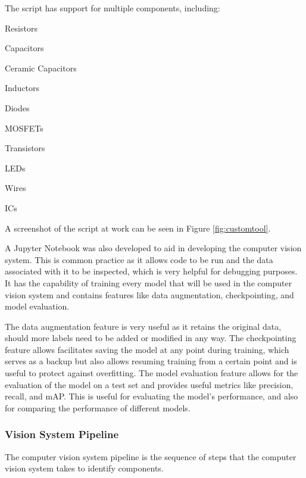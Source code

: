 The script has support for multiple components, including:
\begin{multicols}{2}
    \begin{mylist}
        \item Resistors
        \item Capacitors
        \item Ceramic Capacitors
        \item Inductors
        \item Diodes
        \item MOSFETs
        \item Transistors
        \item LEDs
        \item Wires
        \item ICs
    \end{mylist}
\end{multicols}

\noindent
A screenshot of the script at work can be seen in Figure \ref*{fig:customtool}.

A Jupyter Notebook\cite{jupyter} was also developed to aid in developing the computer vision system. This is common practice as it
allows code to be run and the data associated with it to be inspected, which is very helpful for debugging purposes. It 
has the capability of training every model that will be used in the computer vision system and contains features like
data augmentation, checkpointing, and model evaluation.

The data augmentation feature is very useful as it retains the original data, should more labels need to be added or modified in any way. The checkpointing feature allows
facilitates saving the model at any point during training, which serves as a backup but also allows resuming training from a certain point and is useful
to protect against overfitting. The model evaluation feature allows for the evaluation of the model on a test set and provides
useful metrics like precision, recall, and mAP. This is useful for evaluating the model's performance, and also for
comparing the performance of different models.

\subsubsection{Vision System Pipeline}
The computer vision system pipeline is the sequence of steps that the computer vision system takes to identify components.

